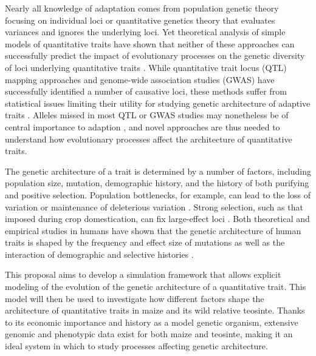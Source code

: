 Nearly all knowledge of adaptation comes from population genetic theory focusing on individual loci or quantitative genetics theory that evaluates variances and ignores the underlying loci. Yet theoretical analysis of simple models of quantitative traits have shown that neither of these approaches can successfully predict the impact of evolutionary processes on the genetic diversity of loci underlying quantitative traits \citep{Chevin:2008, LeCorre:2012co}. 
While quantitative trait locus (QTL) mapping approaches and genome-wide association studies (GWAS) have successfully identified a number of causative loci, these methods suffer from statistical issues limiting their utility for studying genetic architecture of adaptive traits \citep{spencer2009designing,Gibson:2012,Thornton:2013}. Alleles missed in most QTL or GWAS studies may nonetheless be of central importance to adaption \citep{Rockman:2011ej, Mackay:2009}, and novel approaches are thus needed to understand how evolutionary processes affect the architecture of quantitative traits.

The genetic architecture of a trait is determined by a number of factors, including population size, mutation, demographic history, and the history of both purifying and positive selection. Population bottlenecks, for example, can lead to the loss of variation or maintenance of deleterious variation \citep[e.g.][]{Renaut:2015hi, Gunther:2010}. Strong selection, such as that imposed during crop domestication, can fix large-effect loci \citep{Brown:2011}. Both theoretical and empirical studies in humans have shown that the genetic architecture of human traits is shaped by the frequency and effect size of mutations \citep{Thornton:2013} as well as the interaction of demographic and selective histories \citep{Fu:2014jt, Gravel:2011iq, Henn:2015dp}.

This proposal aims to develop a simulation framework that allows explicit modeling of the evolution of the genetic architecture of a quantitative trait. This model will then be used to investigate how different factors shape the architecture of quantitative traits in maize and its wild relative teosinte. Thanks to its economic importance and history as a model genetic organism, extensive genomic \citep{Wright:2005,Hufford:2012dy} and phenotypic \citep{Wallace:2014,Weber:2009} data exist for both maize and teosinte, making it an ideal system in which to study processes affecting genetic architecture.  

